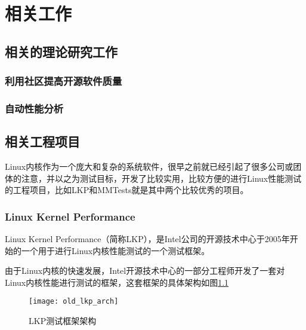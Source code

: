 
\chapter{相关工作}

\section{相关的理论研究工作}

\subsection{利用社区提高开源软件质量}

\subsection{自动性能分析}

\section{相关工程项目}

Linux内核作为一个庞大和复杂的系统软件，很早之前就已经引起了很多公司或团体的注意，并以之为测试目标，开发了比较实用，比较方便的进行Linux性能测试的工程项目，比如LKP\cite{chen2007keeping}和MMTests就是其中两个比较优秀的项目。

\subsection{Linux Kernel Performance}

Linux Kernel Performance（简称LKP），是Intel公司的开源技术中心于2005年开始的一个用于进行Linux内核性能测试的一个测试框架。

由于Linux内核的快速发展，Intel开源技术中心的一部分工程师开发了一套对Linux内核性能进行测试的框架，这套框架的具体架构如图\ref{fig:old_lkp_arch}

\begin{figure}[H]
\centering
\texttt{[image: old\_lkp\_arch]}
\caption{LKP测试框架架构}
\label{fig:old_lkp_arch}
\end{figure}


